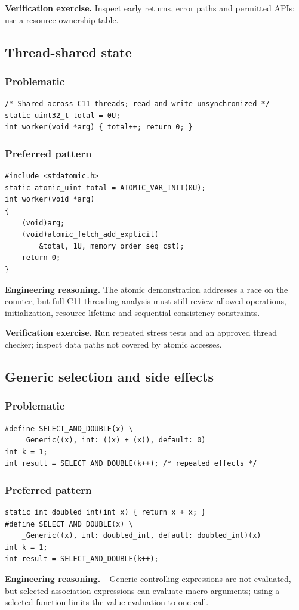 \documentclass[10pt,letterpaper]{article}
\begin{document}
\textbf{Verification exercise.} Inspect early returns, error paths and permitted APIs; use a resource ownership table.

\subsection{Thread-shared state}
\subsubsection*{Problematic}
\begin{lstlisting}[style=engineerc]
/* Shared across C11 threads; read and write unsynchronized */
static uint32_t total = 0U;
int worker(void *arg) { total++; return 0; }
\end{lstlisting}
\subsubsection*{Preferred pattern}
\begin{lstlisting}[style=engineerc]
#include <stdatomic.h>
static atomic_uint total = ATOMIC_VAR_INIT(0U);
int worker(void *arg)
{
    (void)arg;
    (void)atomic_fetch_add_explicit(
        &total, 1U, memory_order_seq_cst);
    return 0;
}
\end{lstlisting}
\textbf{Engineering reasoning.} The atomic demonstration addresses a race on the counter, but full C11 threading analysis must still review allowed operations, initialization, resource lifetime and sequential-consistency constraints.

\textbf{Verification exercise.} Run repeated stress tests and an approved thread checker; inspect data paths not covered by atomic accesses.

\subsection{Generic selection and side effects}
\subsubsection*{Problematic}
\begin{lstlisting}[style=engineerc]
#define SELECT_AND_DOUBLE(x) \
    _Generic((x), int: ((x) + (x)), default: 0)
int k = 1;
int result = SELECT_AND_DOUBLE(k++); /* repeated effects */
\end{lstlisting}
\subsubsection*{Preferred pattern}
\begin{lstlisting}[style=engineerc]
static int doubled_int(int x) { return x + x; }
#define SELECT_AND_DOUBLE(x) \
    _Generic((x), int: doubled_int, default: doubled_int)(x)
int k = 1;
int result = SELECT_AND_DOUBLE(k++);
\end{lstlisting}
\textbf{Engineering reasoning.} \_Generic controlling expressions are not evaluated, but selected association expressions can evaluate macro arguments; using a selected function limits the value evaluation to one call.
\end{document}
